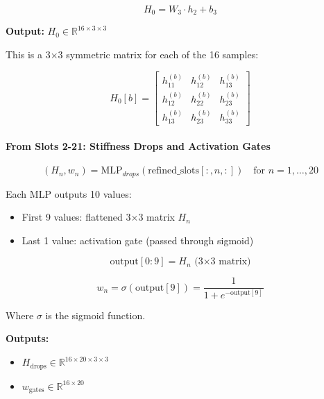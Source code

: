 \documentclass[11pt,a4paper]{article}
\begin{document}
\begin{equation}
H_0 = W_3 \cdot h_2 + b_3
\end{equation}

\textbf{Output:} $H_0 \in \mathbb{R}^{16 \times 3 \times 3}$

This is a 3×3 symmetric matrix for each of the 16 samples:

\begin{equation}
H_0[b] = \begin{bmatrix}
h_{11}^{(b)} & h_{12}^{(b)} & h_{13}^{(b)} \\
h_{12}^{(b)} & h_{22}^{(b)} & h_{23}^{(b)} \\
h_{13}^{(b)} & h_{23}^{(b)} & h_{33}^{(b)}
\end{bmatrix}
\end{equation}

\paragraph{From Slots 2-21: Stiffness Drops and Activation Gates}

\begin{equation}
(H_n, w_n) = \text{MLP}_{drops}(\text{refined\_slots}[:, n, :]) \quad \text{for } n = 1, \ldots, 20
\end{equation}

Each MLP outputs 10 values:
\begin{itemize}
  \item First 9 values: flattened 3×3 matrix $H_n$
  \item Last 1 value: activation gate (passed through sigmoid)
\end{itemize}

\begin{equation}
\text{output}[0:9] = H_n \text{ (3×3 matrix)}
\end{equation}

\begin{equation}
w_n = \sigma(\text{output}[9]) = \frac{1}{1 + e^{-\text{output}[9]}}
\end{equation}

Where $\sigma$ is the sigmoid function.

\textbf{Outputs:}
\begin{itemize}
  \item $H_{\text{drops}} \in \mathbb{R}^{16 \times 20 \times 3 \times 3}$
  \item $w_{\text{gates}} \in \mathbb{R}^{16 \times 20}$
\end{itemize}
\end{document}
